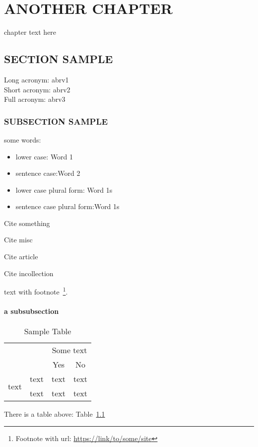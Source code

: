 \chapter{ANOTHER CHAPTER}
chapter text here
\section{SECTION SAMPLE}
Long acronym: \acrlong{abrv1}\\
Short acronym: \acrshort{abrv2}\\
Full acronym: \acrfull{abrv3}
\subsection{SUBSECTION SAMPLE}
some words:
\begin{itemize}
  \item lower case: \gls{Word 1}
  \item sentence case:\Gls{Word 2}
  \item lower case plural form: \glspl{Word 1}
  \item sentence case plural form:\Glspl{Word 1}
\end{itemize}

Cite something~\cite{online1}

Cite misc~\cite{misc1}

Cite article~\cite{article1}

Cite incollection~\cite{incollection1}

text with footnote~\footnote{Footnote with url: \url{https://link/to/some/site}}.

\subsubsection{a subsubsection}
\begin{table}[H]
  \centering
  \caption{Sample Table}\label{tab:1}
  \begin{tabular}{|c|c|c|c|}
    \hline
    \multicolumn{2}{|c|}{}&\multicolumn{2}{c|}{Some text}\\
    \cline{3-4}
    \multicolumn{2}{|c|}{}&Yes&No\\
    \hline
    \multirow{2}{*}{text}&text&text&text\\
    \cline{2-4}
    &text&text&text\\
    \hline
  \end{tabular}
\end{table}

There is a table above: Table~\ref{tab:1}
